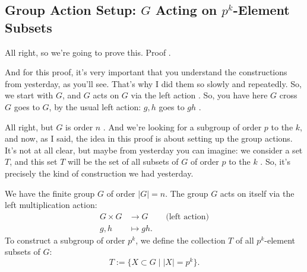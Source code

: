 \begin{proofWrapper}

\subsection{Group Action Setup: \texorpdfstring{$G$}{G} Acting on \texorpdfstring{$p^k$}{p\^{}k}-Element Subsets}

\begin{speech}[00:02:58 - 00:04:16]
All right, so we're going to prove this. Proof .

And for this proof, it's very important that you understand the constructions from yesterday, as you'll see. That's why I did them so slowly and repeatedly. So, we start with $G$, and $G$ acts on $G$ via the left action . So, you have here $G$ cross $G$ goes to $G$, by the usual left action: $g, h$ goes to $g h$ .

All right, but $G$ is order $n$ . And we're looking for a subgroup of order $p$ to the $k$, and now, as I said, the idea in this proof is about setting up the group actions. It's not at all clear, but maybe from yesterday you can imagine: we consider a set $T$, and this set $T$ will be the set of all subsets of $G$ of order $p$ to the $k$ . So, it's precisely the kind of construction we had yesterday.
\end{speech}

\begin{content}
We have the finite group $G$ of order $|G| = n$. The group $G$ acts on itself via the left multiplication action:
\begin{align*}
G \times G &\to G && \text{(left action)} \\
g, h &\mapsto g h.
\end{align*}
To construct a subgroup of order $p^k$, we define the collection $T$ of all $p^k$-element subsets of $G$:
\begin{equation}\label{eq:def-set-T}
T := \bigl\{ X \subset G \;\big|\; |X| = p^k \bigr\}.
\end{equation}
\end{content}


\end{proofWrapper}
